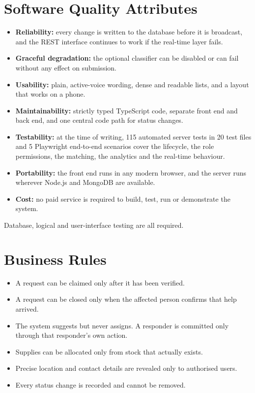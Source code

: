 \documentclass{scrreprt}
\newcounter{fr}
\begin{document}
\section{Software Quality Attributes}
\begin{itemize}
    \item \textbf{Reliability:} every change is written to the database before it is broadcast, and the REST interface continues to work if the real-time layer fails.
    \item \textbf{Graceful degradation:} the optional classifier can be disabled or can fail without any effect on submission.
    \item \textbf{Usability:} plain, active-voice wording, dense and readable lists, and a layout that works on a phone.
    \item \textbf{Maintainability:} strictly typed TypeScript code, separate front end and back end, and one central code path for status changes.
    \item \textbf{Testability:} at the time of writing, 115 automated server tests in 20 test files and 5 Playwright end-to-end scenarios cover the lifecycle, the role permissions, the matching, the analytics and the real-time behaviour.
    \item \textbf{Portability:} the front end runs in any modern browser, and the server runs wherever Node.js and MongoDB are available.
    \item \textbf{Cost:} no paid service is required to build, test, run or demonstrate the system.
\end{itemize}
Database, logical and user-interface testing are all required.

\section{Business Rules}
\begin{itemize}
    \item A request can be claimed only after it has been verified.
    \item A request can be closed only when the affected person confirms that help arrived.
    \item The system suggests but never assigns. A responder is committed only through that responder's own action.
    \item Supplies can be allocated only from stock that actually exists.
    \item Precise location and contact details are revealed only to authorised users.
    \item Every status change is recorded and cannot be removed.
\end{itemize}
\end{document}
